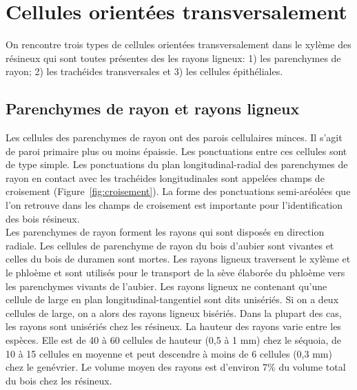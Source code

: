 \section{Cellules orientées transversalement}

On rencontre trois types de cellules orientées transversalement dans le xylème des résineux qui sont toutes présentes des les rayons ligneux: 1) les parenchymes de rayon; 2) les trachéides transversales et 3) les cellules épithéliales.

\subsection{Parenchymes de rayon et rayons ligneux}

Les cellules des parenchymes de rayon ont des parois cellulaires minces. Il s'agit de paroi primaire plus ou moins épaissie. Les ponctuations entre ces cellules sont de type simple. Les ponctuations du plan longitudinal-radial des parenchymes de rayon en contact avec les trachéides longitudinales sont appelées champs de croisement (Figure~\ref{fig:croisement}). La forme des ponctuations semi-aréolées que l'on retrouve dans les champs de croisement est importante pour l'identification des bois résineux.\\

Les parenchymes de rayon forment les rayons qui sont disposés en direction radiale. Les cellules de parenchyme de rayon du bois d'aubier sont vivantes et celles du bois de duramen sont mortes. Les rayons ligneux traversent le xylème et le phloème et sont utilisés pour le transport de la sève élaborée du phloème vers les parenchymes vivants de l'aubier. Les rayons ligneux ne contenant qu'une cellule de large en plan longitudinal-tangentiel sont dits unisériés. Si on a deux cellules de large, on a alors des rayons ligneux bisériés. Dans la plupart des cas, les rayons sont unisériés chez les résineux. La hauteur des rayons varie entre les espèces. Elle est de 40 à 60 cellules de hauteur (0,5 à 1 mm) chez le séquoia, de 10 à 15 cellules en moyenne et peut descendre à moins de 6 cellules (0,3 mm) chez le genévrier. Le volume moyen des rayons est d'environ 7\% du volume total du bois chez les résineux.

